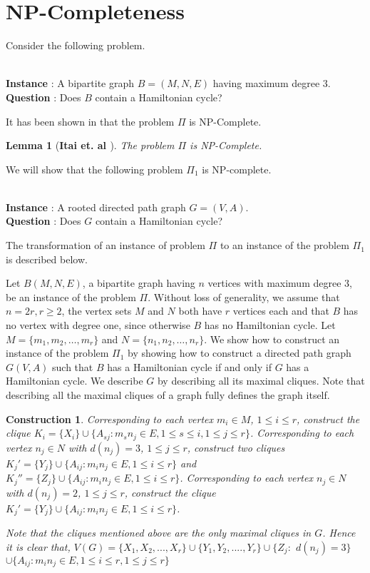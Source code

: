 \documentclass[a4paper,12pt]{article}
\theoremstyle{plain}
\newtheorem{lemma}[theorem]{Lemma}
\newtheorem{cons}[theorem]{Construction}
\theoremstyle{definition}
\theoremstyle{remark}
\begin{document}
\section{NP-Completeness }

Consider the following  problem.

\\
{\bf Instance} : A bipartite graph $B=(M,N,E)$ having maximum degree $3$.\\
{\bf Question} : Does $B$ contain a Hamiltonian cycle?

It has been shown in \cite{itai} that the  problem $\Pi$ is
NP-Complete.

\begin{lemma}[\bf Itai et. al \cite{itai}]\label{lemma3}
The problem $\Pi$ is NP-Complete.
\end{lemma}

We will show that the following problem $\Pi_1$ is NP-complete.

\\
{\bf Instance} : A rooted directed path graph $G=(V,A)$.\\
{\bf Question} : Does $G$ contain a Hamiltonian cycle?

The transformation of an instance of problem $\Pi$ to an instance of
the problem $\Pi_1$ is described below.

Let $B(M,N,E)$, a bipartite graph having $n$ vertices with maximum
degree $3$, be an instance of the problem $\Pi$.  Without loss of
generality, we assume that $n=2r, r \geq 2$, the vertex sets $M$ and
$N$ both have $r$ vertices each and that $B$ has no vertex with
degree one, since otherwise $B$ has  no Hamiltonian cycle. Let
$M=\{m_1, m_2,\ldots,m_r\}$ and $N=\{n_1, n_2,\ldots, n_r\}$. We
show how to construct an instance of the problem $\Pi_1$ by showing
how to construct a directed path graph $G(V,A)$ such that $B$ has a
Hamiltonian cycle if and only if $G$ has a Hamiltonian cycle. We
describe $G$ by describing all its maximal cliques. Note that
describing all the maximal cliques of a graph fully defines the
graph itself.


\begin{cons}\label{cons1}
\noindent Corresponding to each  vertex $m_i \in M$, $1 \leq i \leq
r$,  construct the clique $K_i=\{X_i \} \cup \{A_{sj}: m_sn_j\in E,
1 \leq s \leq i, 1 \leq j \leq r\}$. Corresponding to each  vertex
$n_j \in N$ with $d(n_j)=3$,  $1 \leq j \leq r$, construct two
cliques $K_j'=\{Y_j\} \cup \{A_{ij}: m_in_j \in E, 1 \leq i \leq
r\}$ and $K_j''=\{Z_j\} \cup \{A_{ij}: m_in_j\in E, 1 \leq i \leq
r\}$. Corresponding to each  vertex $n_j \in N$ with $d(n_j)=2$, $1
\leq j \leq r$,  construct the  clique $K_j'=\{Y_j\} \cup \{A_{ij}:
m_in_j \in E, 1 \leq i \leq r\}$.





Note that the cliques mentioned above are the only maximal cliques
in $G$. Hence it is clear that, $V(G)=\{X_1,X_2,...,X_r\}\cup \{Y_1,
Y_2, ....,Y_r\} \cup \{Z_j:$ $d(n_j)=3\}$ $\cup \{A_{ij}:m_in_j \in
E, 1 \leq i \leq r, 1 \leq j \leq r\}$

\end{cons}
\end{document}
